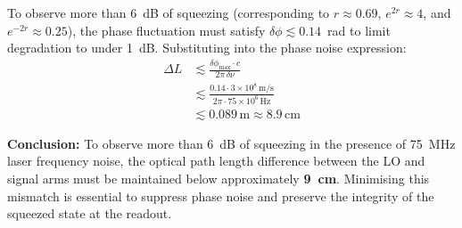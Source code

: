 \documentclass[colorlinks=true,pdfstartview=FitV,linkcolor=blue,
citecolor=red,urlcolor=magenta]{ligodoc}
\begin{document}
To observe more than 6~dB of squeezing (corresponding to \( r \approx 0.69 \), \( e^{2r} \approx 4 \), and \( e^{-2r} \approx 0.25 \)), the phase fluctuation must satisfy \( \delta \phi \lesssim 0.14 \)~rad to limit degradation to under 1~dB. Substituting into the phase noise expression:
\begin{align}
    \Delta L &\lesssim \frac{\delta \phi_{\text{max}} \cdot c}{2\pi \, \delta \nu} \\
             &\lesssim \frac{0.14 \cdot 3 \times 10^8 \, \text{m/s}}{2\pi \cdot 75 \times 10^6 \, \text{Hz}} \\
             &\lesssim 0.089 \, \text{m} \approx 8.9 \, \text{cm}
\end{align}

\noindent\textbf{Conclusion:} To observe more than 6~dB of squeezing in the presence of 75~MHz laser frequency noise, the optical path length difference between the LO and signal arms must be maintained below approximately \textbf{9~cm}. Minimising this mismatch is essential to suppress phase noise and preserve the integrity of the squeezed state at the readout.





\end{document}
